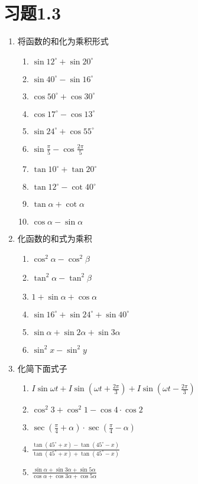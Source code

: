 \section*{习题1.3}
\begin{enumerate}
    \item 将函数的和化为乘积形式
    \begin{multicols}{2}
    \begin{enumerate}
    \item $\sin 12^{\circ}+\sin 20^{\circ}$
    \item $\sin 40^{\circ}-\sin 16^{\circ}$
    \item $\cos 50^{\circ}+\cos 30^{\circ}$
    \item $\cos 17^{\circ}-\cos 13^{\circ} $
    \item $\sin 24^{\circ}+\cos 55^{\circ}$
    \item $\sin \frac{\pi}{5}-\cos \frac{2 \pi}{5}$
    \item $ \tan  10^{\circ}+\tan  20^{\circ}$
    \item $ \tan  12^{\circ}-\cot   40^{\circ}$
    \item $ \tan  \alpha+\cot   \alpha$ 
    \item $\cos \alpha-\sin \alpha$  
    \end{enumerate}   
\end{multicols}
    \item 化函数的和式为乘积
    \begin{multicols}{2}
\begin{enumerate}
 \item  $\cos ^{2} \alpha-\cos ^{2} \beta$
\item  $\tan ^{2} \alpha-\tan ^{2} \beta$
\item  $1+\sin \alpha+\cos \alpha$
\item  $\sin 16^{\circ}+\sin 24^{\circ}+\sin 40^{\circ}$
\item     $\sin \alpha+\sin 2 \alpha+\sin 3 \alpha$
\item $\sin ^{2} x-\sin ^{2} y$   
\end{enumerate}
\end{multicols}

    \item 化简下面式子
    \begin{enumerate}
    \item  $I \sin \omega t+I \sin \left(\omega t+\frac{2 \pi}{3}\right)+I \sin \left(\omega t-\frac{2 \pi}{3}\right)$
    \item  $ \cos ^{2} 3+\cos ^{2} 1-\cos 4 \cdot \cos 2$
    \item  $\sec \left(\frac{\pi}{4}+\alpha\right) \cdot \sec \left(\frac{\pi}{4}-\alpha\right)$
    \item  $\frac{\tan \left(45^{\circ}+x\right)-\tan \left(45^{\circ}-x\right)}{\tan \left(45^{\circ}+x\right)+\tan \left(45^{\circ}-x\right)}$
    \item  $\frac{\sin \alpha+\sin 3 \alpha+\sin 5 \alpha}{\cos \alpha+\cos 3 \alpha+\cos 5 \alpha}$   
    \end{enumerate}


\end{enumerate}
